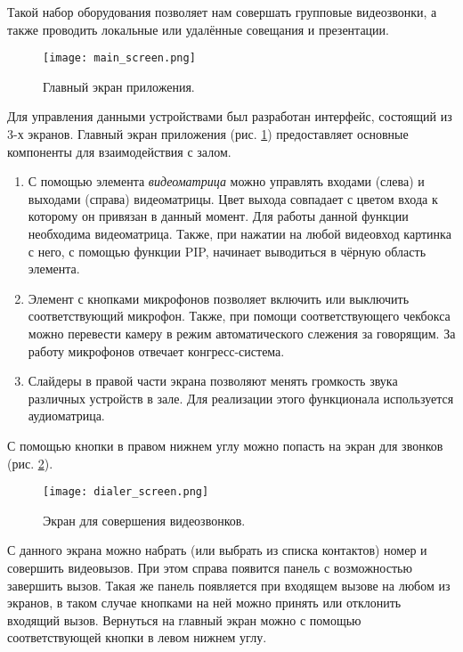 \noindent Такой набор оборудования позволяет нам совершать групповые видеозвонки, а также проводить локальные или удалённые
совещания и презентации.

\begin{figure}[h]
    \centering
    \texttt{[image: main\_screen.png]}
    \caption{Главный экран приложения.}
    \label{fig:main_screen}
\end{figure}

\noindent Для управления данными устройствами был разработан интерфейс, состоящий из 3-х экранов. Главный экран приложения
(рис. \ref{fig:main_screen}) предоставляет основные компоненты для взаимодействия с залом.

\begin{enumerate}
    \item С помощью элемента \textit{видеоматрица} можно управлять входами (слева) и выходами (справа) видеоматрицы.
    Цвет выхода совпадает с цветом входа к которому он привязан в данный момент. Для работы данной функции необходима
    видеоматрица. Также, при нажатии на любой видеовход картинка с него, с помощью функции PIP, начинает выводиться в чёрную
    область элемента.
    \item Элемент с кнопками микрофонов позволяет включить или выключить соответствующий микрофон. Также, при помощи
    соответствующего чекбокса можно перевести камеру в режим автоматического слежения за говорящим. За работу микрофонов
    отвечает конгресс-система.
    \item Слайдеры в правой части экрана позволяют менять громкость звука различных устройств в зале. Для реализации этого
    функционала используется аудиоматрица.
\end{enumerate}

\noindent С помощью кнопки в правом нижнем углу можно попасть на экран для звонков (рис. \ref{fig:dialer_screen}).

\begin{figure}[h]
    \centering
    \texttt{[image: dialer\_screen.png]}
    \caption{Экран для совершения видеозвонков.}
    \label{fig:dialer_screen}
\end{figure}

\noindent С данного экрана можно набрать (или выбрать из списка контактов) номер и совершить видеовызов. При этом справа
появится панель с возможностью завершить вызов. Такая же панель появляется при входящем вызове на любом из экранов,
в таком случае кнопками на ней можно принять или отклонить входящий вызов. Вернуться на главный экран можно с помощью
соответствующей кнопки в левом нижнем углу.

